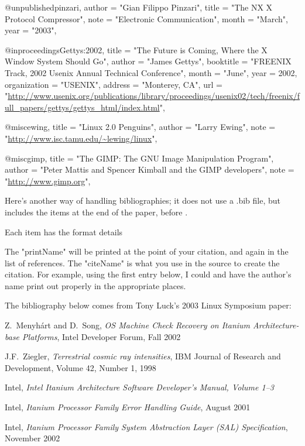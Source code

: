 @unpublished{pinzari,
 author		= "Gian Filippo Pinzari",
 title		= "The NX X Protocol Compressor",
 note		= "Electronic Communication",
 month		= "March",
 year		= "2003",
 }
 
@inproceedings{Gettys:2002,
  title = "{The Future is Coming, Where the X Window System Should Go}",
  author        = "James Gettys",
  booktitle	= "FREENIX Track, 2002 Usenix Annual Technical Conference",
  month		= "June",
  year		= 2002,
  organization	= "USENIX",
  address       = "Monterey, CA",
  url = "\url{http://www.usenix.org/publications/library/proceedings/usenix02/tech/freenix/full_papers/gettys/gettys_html/index.html}",
}

@misc{ewing,
 title          = "Linux 2.0 Penguins",
 author         = "Larry Ewing",
 note           = "\url{http://www.isc.tamu.edu/~lewing/linux}",
}

@misc{gimp,
 title          = "The {GIMP}: The {GNU} Image Manipulation Program",
 author         = "Peter Mattis and Spencer Kimball and the GIMP developers",
 note           = "\url{http://www.gimp.org}",
}


Here's another way of handling bibliographies; it does
not use a .bib file, but includes the items at the end
of the paper, before .

Each item has the format
 details

The "printName" will be printed at the point of your citation,
and again in the list of references.  The "citeName" is what
you use in the source to create the citation.  For example,
using the first entry below, I could \cite{menyhart} and
have the author's name print out properly in the appropriate
places.

The bibliography below comes from Tony Luck's 2003 Linux
Symposium paper:


\begin{thebibliography}{99}
\raggedright
{} Z.\ Menyh\'{a}rt and D.\ Song,
{\em OS Machine Check Recovery on Itanium Architecture-base Platforms},
Intel Developer Forum, Fall 2002

 J.F.\ Ziegler,
{\em Terrestrial cosmic ray intensities},
IBM Journal of Research and Development, Volume 42, Number 1, 1998

 Intel,
{\em Intel Itanium Architecture Software Developer's Manual, Volume 1--3}

 Intel,
{\em Itanium Processor Family Error Handling Guide}, August 2001

 Intel,
{\em Itanium Processor Family System Abstraction Layer (SAL) Specification}, November 2002

\end{thebibliography}


